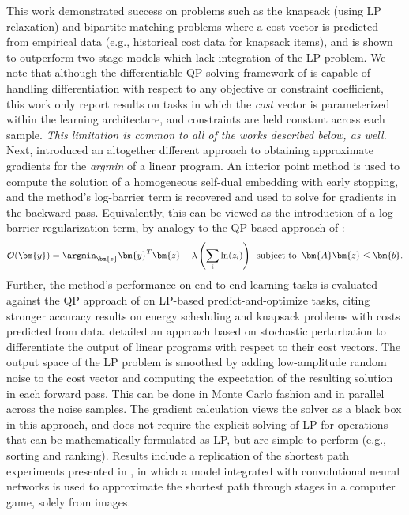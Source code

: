  This work demonstrated success on problems such as the knapsack (using LP relaxation) and bipartite matching problems where a cost vector is predicted from empirical data (e.g., historical cost data for knapsack items), and is shown to outperform two-stage models which lack integration of the LP problem. We note that although the differentiable QP solving framework of  is capable of handling differentiation with respect to any objective or constraint coefficient, this work only report results on tasks in which the \emph{cost} vector is parameterized within the learning architecture, and constraints are held constant across each sample. 
\emph{This limitation is common to all of the works described below, as well.} 
Next,  introduced an altogether different approach to obtaining approximate gradients for the {\em argmin} of a linear program. An interior point method is used to compute the solution of a homogeneous self-dual embedding with early stopping, and the method's log-barrier term is recovered and used to solve for gradients in the backward pass. Equivalently, this can be viewed as the introduction of a log-barrier regularization term, by analogy to the QP-based approach of :
\begin{equation*}
\label{eq:opt_theta_QP}
\mathcal{O}(\bm{y}) = \argmin_{\bm{z}} \bm{y}^T\bm{z} + 
  \lambda\left(\sum_i \ln (z_i) \right) \;\;
  \text{subject to} \;\;
  \bm{A}\bm{z} \leq \bm{b}.
\end{equation*}
Further, the method's performance on end-to-end learning tasks is evaluated against the QP approach of  on LP-based predict-and-optimize tasks, citing stronger accuracy results on energy scheduling and knapsack problems with costs predicted from data. 
 detailed an approach based on stochastic perturbation to differentiate the output of linear programs with respect to their cost vectors. The output space of the LP problem is smoothed by adding low-amplitude random noise to the cost vector and computing the expectation of the resulting solution in each forward pass. This can be done in Monte Carlo fashion and in parallel across the noise samples. The gradient calculation views the solver as a black box in this approach, and does not require the explicit solving of LP for operations that can be mathematically formulated as LP, but are simple to perform (e.g., sorting and ranking). Results include a replication of the shortest path experiments presented in , in which a model integrated with convolutional neural networks is used to approximate the shortest path through stages in a computer game, solely from images.

